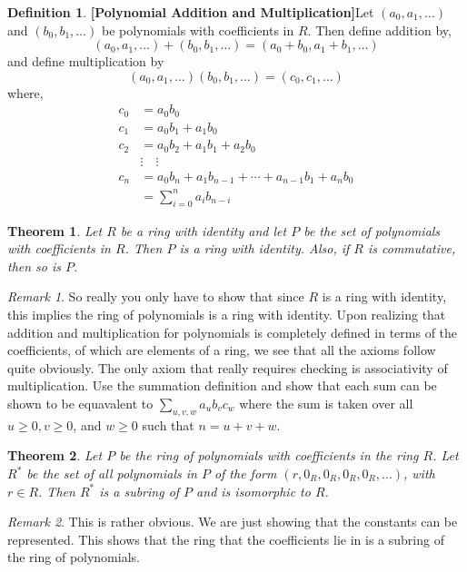\documentclass{article}
\newtheorem{theorem}{Theorem}[section]
\theoremstyle{definition}
\newtheorem{definition}{Definition}[section]
\theoremstyle{remark}
\newtheorem{remark}{Remark}[section]
\begin{document}
\begin{definition}\textbf{[Polynomial Addition and Multiplication]}\label{def:poly add and multiply}
Let $(a_0, a_1, \dots )$ and $(b_0, b_1, \dots )$ be polynomials 
with coefficients in $R$. Then define addition by, \[
    (a_0, a_1, \dots ) + (b_0, b_1, \dots ) = (a_0 + b_0, a_1 + b_1, \dots )
\]
and define multiplication by
\[
    (a_0, a_1, \dots )(b_0, b_1, \dots ) = (c_0, c_1, \dots )
\]
where, \begin{align*}
    c_0 &= a_0 b_0 \\
    c_1 &= a_0 b_1 + a_1 b_0 \\
    c_2 &= a_0 b_2 + a_1 b_1 + a_2 b_0 \\
        & \vdots \quad \vdots \\
    c_n &= a_0 b_n + a_1 b_{n-1} + \cdots + a_{n-1}b_1 + a_n b_0 \\
    &= \sum^n_{i=0}{a_ib_{n-i}}
\end{align*}
\end{definition}


\begin{theorem}
Let $R$ be a ring with identity and let $P$ be the set of polynomials
with coefficients in $R$. Then $P$ is a ring with identity. Also, if $R$ is commutative, then so is $P$.
\end{theorem}
\begin{remark}
So really you only have to show that since $R$ is a ring with identity, this implies 
the ring of polynomials is a ring with identity. Upon realizing that addition and multiplication
for polynomials is completely defined in terms of the coefficients, of which are elements 
of a ring, we see that all the axioms follow quite obviously. The only 
axiom that really requires checking is associativity of multiplication.
Use the summation definition and show that each sum 
can be shown to be equavalent to $\sum_{u,v,w}{a_ub_vc_w}$ where the sum 
is taken over all $u \geq 0, v \geq 0$, and $w \geq 0$ such that 
$n=u+v+w$.
\end{remark}


\begin{theorem}
Let $P$ be the ring of polynomials with coefficients in the ring $R$. 
Let $R^*$ be the set of all polynomials in $P$ of the form $(r,0_R,0_R, 0_R, 0_R, \dots )$,
with $r\in R$. Then $R^*$ is a subring of $P$ and is isomorphic to $R$.
\end{theorem}
\begin{remark}
This is rather obvious. We are just showing that the constants can be represented. This shows that 
the ring that the coefficients lie in is a subring of the ring of polynomials. 
\end{remark}
\end{document}
